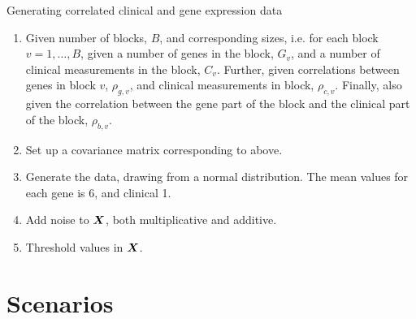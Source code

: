 \begin{algorithm}
\caption{Generating correlated clinical and gene expression data}
\label{algo:clinical-sim}
\begin{enumerate}
    \item
        Given number of blocks, $B$, and corresponding sizes, i.e. for each block $v=1,\ldots,B$, given a number of genes in the block, $G_v$, and a number of clinical measurements in the block, $C_v$.
        Further, given correlations between genes in block $v$, $\rho_{g,v}$, and clinical measurements in block, $\rho_{c,v}$.
        Finally, also given the correlation between the gene part of the block and the clinical part of the block, $\rho_{b,v}$.
    \item
        Set up a covariance matrix corresponding to above.
    \item
        Generate the data, drawing from a normal distribution.
        The mean values for each gene is 6, and clinical 1.
    \item
        Add noise to $\bm{X}$, both multiplicative and additive.
    \item
        Threshold values in $\bm{X}$.
\end{enumerate}
\end{algorithm}

\section{Scenarios}
